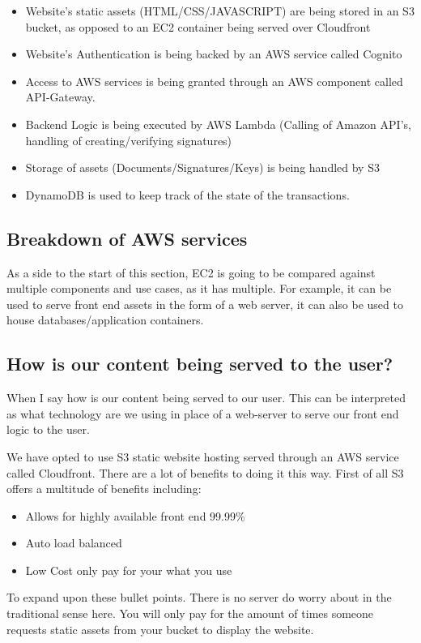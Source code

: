 \documentclass[runningheads]{llncs}
\begin{document}
\begin{itemize}
	\item Website's static assets (HTML/CSS/JAVASCRIPT) are being stored in an S3 bucket, as opposed to an EC2 container being served over Cloudfront
	\item Website's Authentication is being backed by an AWS service called Cognito
	\item Access to AWS services is being granted through an AWS component called API-Gateway.
	\item Backend Logic is being executed by AWS Lambda (Calling of Amazon API's, handling of creating/verifying signatures)
	\item Storage of assets (Documents/Signatures/Keys) is being handled by S3
	\item DynamoDB is used to keep track of the state of the transactions.
\end{itemize}

\subsection{Breakdown of AWS services}
As a side to the start of this section, EC2 is going to be compared against multiple components and use cases, as it has multiple. For example, it can be used to serve front end assets in the form of a web server, it can also be used to house databases/application containers.
\subsection{How is our content being served to the user?}
When I say how is our content being served to our user. This can be interpreted as what technology are we using in place of a web-server to serve our front end logic to the user.

We have opted to use S3 static website hosting served through an AWS service called Cloudfront. There are a lot of benefits to doing it this way. First of all S3 offers a multitude of benefits including:

\begin{itemize}
	\item Allows for highly available front end 99.99\%
	\item Auto load balanced
	\item Low Cost only pay for your what you use
\end{itemize}
To expand upon these bullet points. There is no server do worry about in the traditional sense here. You will only pay for the amount of times someone requests static assets from your bucket to display the website.
\end{document}
